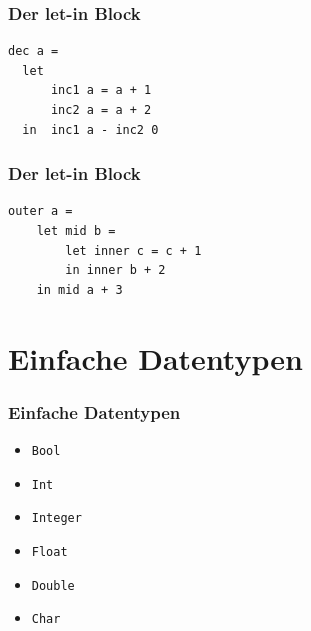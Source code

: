 \begin{frame}[fragile]
\frametitle{Der let-in Block}
\begin{lstlisting}
dec a = 
  let               
      inc1 a = a + 1
      inc2 a = a + 2
  in  inc1 a - inc2 0
\end{lstlisting}
\end{frame}

\begin{frame}[fragile]
\frametitle{Der let-in Block}
\begin{lstlisting}
outer a = 
    let mid b = 
        let inner c = c + 1
        in inner b + 2
    in mid a + 3	
\end{lstlisting}
\end{frame}

\section{Einfache Datentypen}
\begin{frame}
\frametitle{Einfache Datentypen}
\begin{block}{\vspace*{-3ex}}
\begin{itemize}
  \item \lstinline|Bool|
  \item \lstinline|Int|
  \item \lstinline|Integer|
  \item \lstinline|Float|
  \item \lstinline|Double|
  \item \lstinline|Char|
\end{itemize}
\end{block}
\end{frame}

